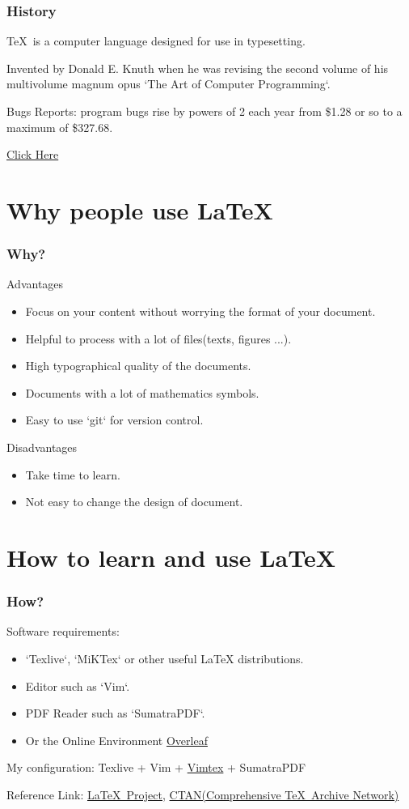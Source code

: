 \documentclass{beamer}
\begin{document}
\begin{frame}
\frametitle{History}
\TeX\ is a computer language designed for use in typesetting.

Invented by Donald E. Knuth when he was revising the second volume of his multivolume magnum opus `The Art of Computer Programming`.

Bugs Reports: program bugs rise by powers of 2 each year from \$1.28 or so to a maximum of \$327.68.

\href{https://www.tug.org/whatis.html}{Click Here}
\end{frame}

\section{Why people use \LaTeX}
\begin{frame}
\frametitle{Why?}
Advantages
\begin{itemize}
	\item Focus on your content without worrying the format of your document.
	\item Helpful to process with a lot of files(texts, figures ...).
	\item High typographical quality of the documents.
	\item Documents with a lot of mathematics symbols.
	\item Easy to use `git` for version control.
\end{itemize}
Disadvantages
\begin{itemize}
	\item Take time to learn.
	\item Not easy to change the design of document.
\end{itemize}
\end{frame}

\section{How to learn and use \LaTeX}
\begin{frame}
\frametitle{How?}
Software requirements: 
\begin{itemize}
	\item `Texlive`, `MiKTex` or other useful LaTeX distributions. 
	\item Editor such as `Vim`.
	\item PDF Reader such as `SumatraPDF`.
	\item Or the Online Environment \href{overleaf.com/}{Overleaf}
\end{itemize}
My configuration: Texlive + Vim + \href{https://github.com/lervag/vimtex}{Vimtex} + SumatraPDF

Reference Link: \href{https://www.latex-project.org/get/}{\LaTeX\ Project}, \href{https://www.ctan.org/pkg/latex}{CTAN(Comprehensive \TeX\ Archive Network)}
\end{frame}
\end{document}
